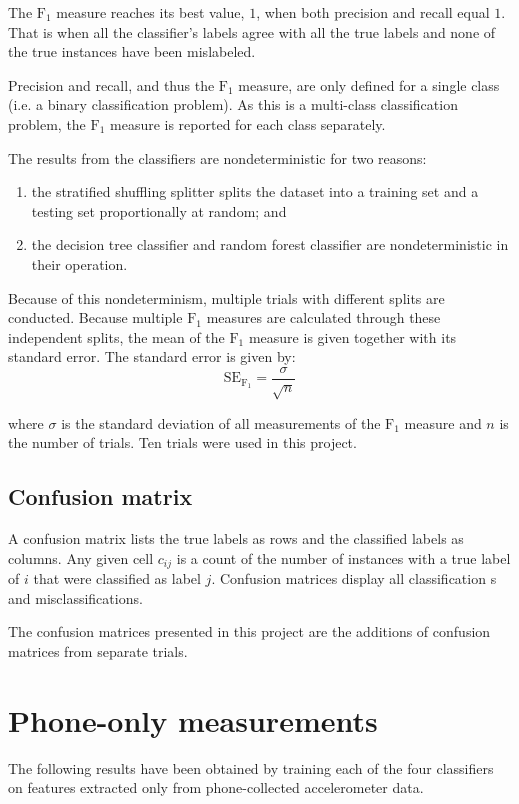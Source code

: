       The $\mathrm{F}_1$ measure reaches its best value, $1$, when both precision and recall equal $1$. That is when all the classifier's labels agree with all the true labels and none of the true instances have been mislabeled.
      
      Precision and recall, and thus the $\mathrm{F}_1$ measure, are only defined for a single class (i.e. a binary classification problem). As this is a multi-class classification problem, the $\mathrm{F}_1$ measure is reported for each class separately.
      
      The results from the classifiers are nondeterministic for two reasons:
      \begin{enumerate}
        \item the stratified shuffling splitter splits the dataset into a training set and a testing set proportionally at random; and
        \item the decision tree classifier and random forest classifier are nondeterministic in their operation.
      \end{enumerate}
      
      Because of this nondeterminism, multiple trials with different splits are conducted. Because multiple $\mathrm{F}_1$ measures are calculated through these independent splits, the mean of the $\mathrm{F}_1$ measure is given together with its standard error. The standard error is given by:
      $$\mathrm{SE}_{\mathrm{F}_1} = \frac{\sigma}{\sqrt{n}}$$
      
      where $\sigma$ is the standard deviation of all measurements of the $\mathrm{F}_1$ measure and $n$ is the number of trials. Ten trials were used in this project.
        
    \subsection {Confusion matrix}
      A confusion matrix lists the true labels as rows and the classified labels as columns. Any given cell $c_{ij}$ is a count of the number of instances with a true label of $i$ that were classified as label $j$. Confusion matrices display all classification s and misclassifications.
      
      The confusion matrices presented in this project are the additions of confusion matrices from separate trials.
    
  
  \section{Phone-only measurements}
    The following results have been obtained by training each of the four classifiers on features extracted only from phone-collected accelerometer data.
    
